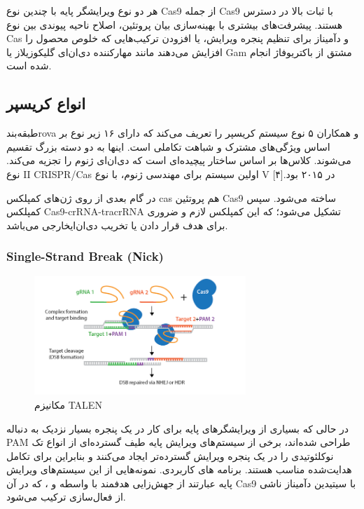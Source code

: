 \documentclass[12pt,a4paper,BCOR=.7cm,headsepline,bibliography=totoc]{report}
\begin{document}
هر دو نوع ویرایشگر پایه با چندین نوع Cas9 از جمله Cas9 با ثبات بالا در دسترس هستند. پیشرفت‌های بیشتری با بهینه‌سازی بیان پروتئین، اصلاح ناحیه پیوندی بین نوع Cas و دآمیناز برای تنظیم پنجره ویرایش، یا افزودن ترکیب‌هایی که خلوص محصول را افزایش می‌دهند مانند مهارکننده دی‌ان‌ای گلیکوزیلاز  یا Gam مشتق از باکتریوفاژ  انجام شده است.






\subsection{انواع کریسپر}
طبقه‌بندrova و همکاران ۵ نوع سیستم کریسپر را تعریف می‌کند که دارای ۱۶ زیر نوع بر اساس ویژگی‌های مشترک و شباهت تکاملی است. اینها به دو دسته بزرگ تقسیم می‌شوند. کلاس‌ها بر اساس ساختار پیچیده‌ای است که دی‌ان‌ای ژنوم را تجزیه می‌کند. نوع II CRISPR/Cas اولین سیستم برای مهندسی ژنوم، با نوع V در ۲۰۱۵ بود.[۴]

در گام بعدی از روی ژن‌های کمپلکس cas هم پروتئین Cas9 ساخته می‌شود. سپس کمپلکس Cas9-crRNA-tracrRNA تشکیل می‌شود؛ که این کمپلکس لازم و ضروری برای هدف قرار دادن یا تخریب دی‌ان‌ایخارجی می‌باشد.

\subsubsection{ Single-Strand Break (Nick)}
\begin{figure}
\centering
\includegraphics[width=8cm, ]{pictures/nick.png}
\caption{
مکانیزم TALEN \cite{addgene}
}\label{wrap-fig:4}
\end{figure}
در حالی که بسیاری از ویرایشگرهای پایه برای کار در یک پنجره بسیار نزدیک به دنباله PAM طراحی شده‌اند، برخی از سیستم‌های ویرایش پایه طیف گسترده‌ای از انواع تک نوکلئوتیدی  را در یک پنجره ویرایش گسترده‌تر ایجاد می‌کنند و بنابراین برای تکامل هدایت‌شده مناسب هستند. برنامه های کاربردی. نمونه‌هایی از این سیستم‌های ویرایش پایه عبارتند از جهش‌زایی هدفمند با واسطه  و ، که در آن Cas9 با سیتیدین دآمیناز  ناشی از فعال‌سازی ترکیب می‌شود.
\end{document}
